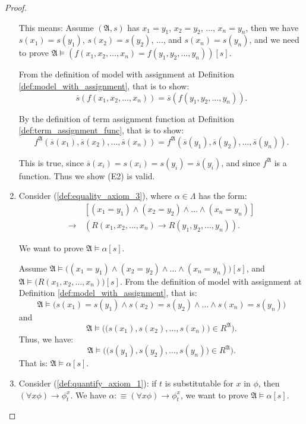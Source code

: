 \documentclass[11pt,letterpaper]{book}
\theoremstyle{definition}
\begin{document}
\begin{proof}
\begin{enumerate}
{This means: Assume $(\mathfrak{A}, s)$ has $x_1 = y_1$, $x_2=y_2$,
$\ldots$, $x_n=y_n$, then we have $s(x_1) = s(y_1)$, $s(x_2)= s(y_2)$,
$\ldots$, and $s(x_n)=s(y_n)$, and we need to prove $\mathfrak{A} \models (
f(x_1, x_2, \ldots, x_n) = f(y_1, y_2, \ldots, y_n) )[s]$.

   From the definition of model with assignment at Definition
\ref{def:model_with_assignment}, that is to show:
$$ \overline{s} ( f(x_1, x_2, \ldots, x_n)  ) = \overline{s}( f(y_1,
y_2, \ldots, y_n)). $$

By the definition of term assignment function at Definition
\ref{def:term_assignment_func}, that is to show:
$$ f^{\mathfrak{A}} ( \overline{s} (x_1), \overline{s} (x_2), \ldots,
\overline{s} (x_n) ) = f^{\mathfrak{A}} ( \overline{s} (y_1),
\overline{s} (y_2), \ldots, \overline{s} (y_n)  ) . $$

This is true, since $\overline{s} (x_i) = s(x_i) = s(y_i) = \overline{s}
(y_i)$, and since $f^{\mathfrak{A}}$ is a function. Thus we show (E2) is
valid.
}
\item{Consider (\ref{def:equality_axiom_3}), where $\alpha \in \Lambda $
has the form:
\begin{equation}
\begin{aligned}
& [(x_1 = y_1) \land (x_2=y_2) \land \ldots \land (x_n=y_n) ] \\
\rightarrow\, & ( R(x_1, x_2, \ldots, x_n) \rightarrow R(y_1, y_2,
\ldots, y_n) ).
\end{aligned}\nonumber
\end{equation}

We want to prove $\mathfrak{A} \models \alpha[s]$.

Assume $\mathfrak{A} \models \big( (x_1 = y_1) \land (x_2=y_2) \land
\ldots \land (x_n=y_n) \big)[s]$, and $\mathfrak{A} \models \big( R(x_1,
x_2, \ldots, x_n) \big) [s] $. From the definition of model with
assignment at Definition \ref{def:model_with_assignment}, that is:
$$\mathfrak{A} \models \Big( s(x_1) = s(y_1)  \land s(x_2) = s(y_2)
\land \ldots \land s(x_n) = s(y_n)  \Big)$$
and
$$\mathfrak{A} \models \Big( \big( s(x_1), s(x_2), \ldots, s(x_n) \big)
\in R^{\mathfrak{A}} \Big) .$$
Thus, we have:
$$\mathfrak{A} \models \Big( \big( s(y_1), s(y_2), \ldots, s(y_n) \big)
\in R^{\mathfrak{A}} \Big) .$$
That is: $\mathfrak{A} \models \alpha[s]$.
}

\item{Consider (\ref{def:quantify_axiom_1}): if $t$ is substitutable for
$x$ in $\phi$, then $ (\forall x \phi) \rightarrow \phi_t ^{x}$. We have
$\alpha: \equiv (\forall x \phi) \rightarrow \phi_t ^{x}$, we
want to prove $\mathfrak{A} \models \alpha[s]$.

}
\end{enumerate}
\end{proof}
\end{document}
